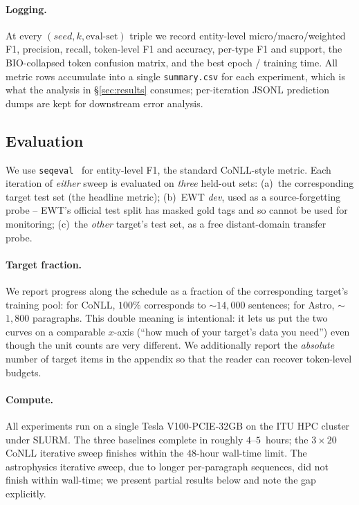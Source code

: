 \documentclass[11pt]{article}
\begin{document}
\paragraph{Logging.}
At every $(seed, k, \text{eval-set})$ triple we record entity-level
micro/macro/weighted F1, precision, recall, token-level F1 and accuracy,
per-type F1 and support, the BIO-collapsed token confusion matrix, and the
best epoch / training time. All metric rows accumulate into a single
\texttt{summary.csv} for each experiment, which is what the analysis in
\S\ref{sec:results} consumes; per-iteration JSONL prediction dumps are kept
for downstream error analysis.

\subsection{Evaluation}
\label{sec:eval}

We use \texttt{seqeval}~\citep{nakayama-2018-seqeval} for entity-level F1, the
standard CoNLL-style metric. Each iteration of \emph{either} sweep is
evaluated on \emph{three} held-out sets: (a)~the corresponding target test
set (the headline metric); (b)~EWT \emph{dev}, used as a source-forgetting
probe -- EWT's official test split has masked gold tags and so cannot be used
for monitoring; (c)~the \emph{other} target's test set, as a free
distant-domain transfer probe.

\paragraph{Target fraction.}
We report progress along the schedule as a fraction of the corresponding
target's training pool: for CoNLL, $100\%$ corresponds to
$\sim$$14{,}000$ sentences; for Astro, $\sim$$1{,}800$ paragraphs. This
double meaning is intentional: it lets us put the two curves on a comparable
$x$-axis (``how much of your target's data you need'') even though the unit
counts are very different. We additionally report the \emph{absolute} number
of target items in the appendix so that the reader can recover token-level
budgets.

\paragraph{Compute.}
All experiments run on a single Tesla V100-PCIE-32GB on the ITU HPC cluster
under SLURM. The three baselines complete in roughly $4$--$5$~hours; the
$3{\times}20$ CoNLL iterative sweep finishes within the $48$-hour wall-time
limit. The astrophysics iterative sweep, due to longer per-paragraph
sequences, did not finish within wall-time; we present partial results below
and note the gap explicitly.
\end{document}
